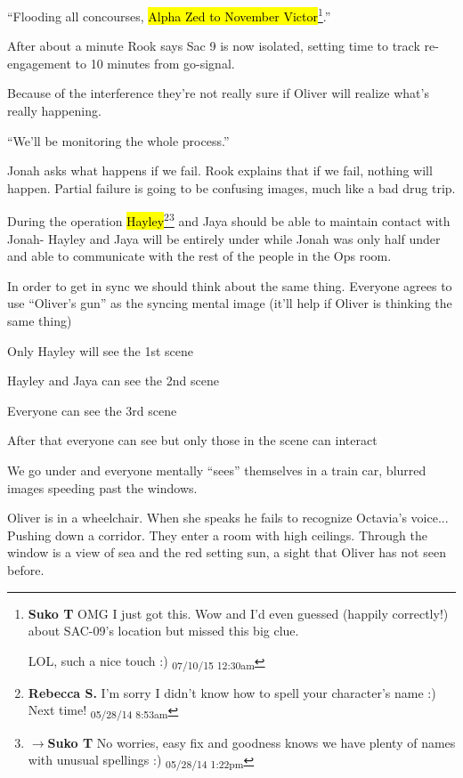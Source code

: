 ``Flooding all concourses, \hl{Alpha Zed to November Victor}\footnote{\textbf{Suko T }OMG I just got this.  Wow and I'd even guessed (happily correctly!) about SAC-09's location but missed this big clue.  

LOL, such a nice touch :) \textsubscript{07/10/15 12:30am}}.''

After about a minute Rook says Sac 9 is now isolated, setting time to track re-engagement to 10 minutes from go-signal. 

Because of the interference they're not really sure if Oliver will realize what's really happening. 

``We'll be monitoring the whole process.''

Jonah asks what happens if we fail.  Rook explains that if we fail, nothing will happen.  Partial failure is going to be confusing images, much like a bad drug trip.

During the operation \hl{Hayley}\footnote{\textbf{Rebecca S. }I'm sorry I didn't know how to spell your character's name :)  Next time! \textsubscript{05/28/14 8:53am}}\footnote{$\rightarrow$\textbf{Suko T }No worries, easy fix and goodness knows we have plenty of names with unusual spellings :) \textsubscript{05/28/14 1:22pm}} and Jaya should be able to maintain contact with Jonah- Hayley and Jaya will be entirely under while Jonah was only half under and able to communicate with the rest of the people in the Ops room.

In order to get in sync we should think about the same thing. Everyone agrees to use ``Oliver's gun'' as the syncing mental image (it'll help if Oliver is thinking the same thing)



Only Hayley will see the 1st scene

Hayley and Jaya can see the 2nd scene

Everyone can see the 3rd scene

After that everyone can see but only those in the scene can interact



We go under and everyone mentally ``sees'' themselves in a train car, blurred images speeding past the windows.





Oliver is in a wheelchair.  When she speaks he fails to recognize Octavia's voice...  Pushing down a corridor.  They enter a room with high ceilings.  Through the window is a view of sea and the red setting sun, a sight that Oliver has not seen before.



